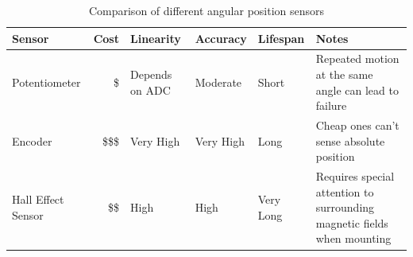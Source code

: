 \begin{table}[H]
	\begin{center}
		\caption{Comparison of different angular position sensors}
		\label{tbl:Angular_pos_sensorsP}
		\begin{tabular}{ | p{2.4cm} | r | p{1.6cm} | l | l | p{2.5cm} |}
			\hline
			Sensor & Cost & Linearity & Accuracy & Lifespan & Notes
			\\ \hline
			Potentiometer & \$ & Depends on ADC & Moderate & Short & Repeated motion at the same angle can lead to failure
			\\ \hline
			Encoder & \$\$\$ & Very High & Very High & Long & Cheap ones can't sense absolute position
			\\ \hline
			Hall Effect Sensor & \$\$ & High & High & Very Long & Requires special attention to surrounding magnetic fields when mounting
			\\ \hline
		\end{tabular}
	\end{center}
\end{table}

